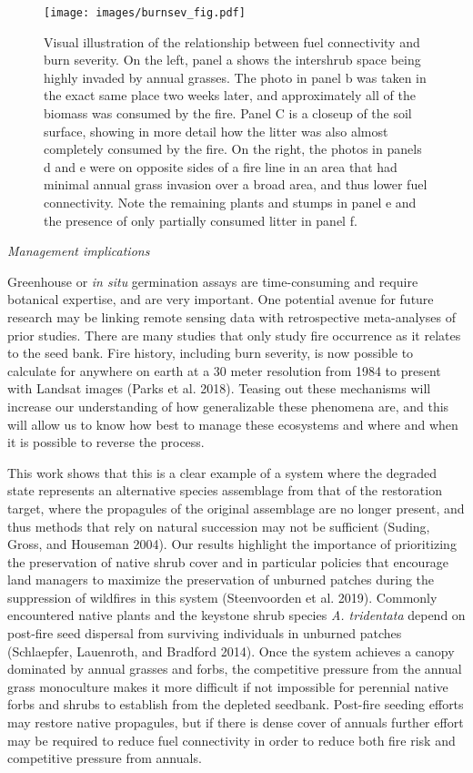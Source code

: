 \documentclass[
  12pt,
]{article}
\begin{document}
\begin{figure}
\centering
\texttt{[image: images/burnsev\_fig.pdf]}
\caption{Visual illustration of the relationship between fuel
connectivity and burn severity. On the left, panel a shows the
intershrub space being highly invaded by annual grasses. The photo in
panel b was taken in the exact same place two weeks later, and
approximately all of the biomass was consumed by the fire. Panel C is a
closeup of the soil surface, showing in more detail how the litter was
also almost completely consumed by the fire. On the right, the photos in
panels d and e were on opposite sides of a fire line in an area that had
minimal annual grass invasion over a broad area, and thus lower fuel
connectivity. Note the remaining plants and stumps in panel e and the
presence of only partially consumed litter in panel f.}
\end{figure}

\emph{Management implications}

Greenhouse or \emph{in situ} germination assays are time-consuming and
require botanical expertise, and are very important. One potential
avenue for future research may be linking remote sensing data with
retrospective meta-analyses of prior studies. There are many studies
that only study fire occurrence as it relates to the seed bank. Fire
history, including burn severity, is now possible to calculate for
anywhere on earth at a 30 meter resolution from 1984 to present with
Landsat images (Parks et al. 2018). Teasing out these mechanisms will
increase our understanding of how generalizable these phenomena are, and
this will allow us to know how best to manage these ecosystems and where
and when it is possible to reverse the process.

This work shows that this is a clear example of a system where the
degraded state represents an alternative species assemblage from that of
the restoration target, where the propagules of the original assemblage
are no longer present, and thus methods that rely on natural succession
may not be sufficient (Suding, Gross, and Houseman 2004). Our results
highlight the importance of prioritizing the preservation of native
shrub cover and in particular policies that encourage land managers to
maximize the preservation of unburned patches during the suppression of
wildfires in this system (Steenvoorden et al. 2019). Commonly
encountered native plants and the keystone shrub species \emph{A.
tridentata} depend on post-fire seed dispersal from surviving
individuals in unburned patches (Schlaepfer, Lauenroth, and Bradford
2014). Once the system achieves a canopy dominated by annual grasses and
forbs, the competitive pressure from the annual grass monoculture makes
it more difficult if not impossible for perennial native forbs and
shrubs to establish from the depleted seedbank. Post-fire seeding
efforts may restore native propagules, but if there is dense cover of
annuals further effort may be required to reduce fuel connectivity in
order to reduce both fire risk and competitive pressure from annuals.
\end{document}

